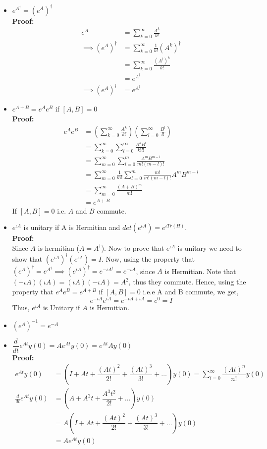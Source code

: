 \documentclass[12pt, oneside]{book}
\theoremstyle{definition}
\theoremstyle{definition}
\theoremstyle{remark}
\begin{document}
\begin{itemize}
    \item $e^{A^{\dagger}}=(e^A)^{\dagger}$\\
    \textbf{Proof: }
    \begin{align*}
        e^A&=\sum_{k=0}^{\infty} \frac{A^k}{k!}\\
        \implies (e^A)^{\dagger}&=\sum_{k=0}^{\infty} \frac{1}{k!}(A^k)^{\dagger}\\
        &=\sum_{k=0}^{\infty} \frac{(A^{\dagger})^k}{k!}\\
        &=e^{A^{\dagger}}\\
        \implies (e^A)^{\dagger}&=e^{A^{\dagger}}
    \end{align*}
    \item $e^{A+B}=e^Ae^B$ if $[A,B]=0$\\
    \textbf{Proof: }
    \begin{align*}
    e^Ae^B&=\left(\sum_{k=0}^{\infty} \frac{A^k}{k!} \right)\left(\sum_{l=0}^{\infty} \frac{B^l}{l!}\right)\\
    &=\sum_{k=0}^{\infty} \sum_{l=0}^{\infty} \frac{A^{k}B^{l}}{k!l!}\\
    &=\sum_{m=0}^{\infty} \sum_{l=0}^{m} \frac{A^mB^{m-l}}{m!(m-l)!}\\
    &=\sum_{m=0}^{\infty} \frac{1}{m!} \sum_{l=0}^m \frac{m!}{m!(m-l)!}A^mB^{m-l}\\
    &=\sum_{m=0}^{\infty} \frac{(A+B)^m}{m!}\\
    &=e^{A+B}
    \end{align*}
    If $[A,B]=0$ i.e. $A$ and $B$ commute.
    \item $e^{\iota A}$ is unitary if A is Hermitian and $det(e^{\iota A})= e^{\iota Tr(H)}$.\\
    \textbf{Proof: }\\
    Since $A$ is hermitian ($A=A^{\dagger}$). Now to prove that $e^{\iota A}$ is unitary we need to show that $(e^{\iota A})^{\dagger}(e^{\iota A})=I$. Now, using the property that $(e^{A})^{\dagger}=e^{A^{\dagger}} \implies (e^{\iota A})^{\dagger}=e^{-\iota A^{\dagger}}=e^{-\iota A}$, since $A$ is Hermitian. Note that $(-\iota A)(\iota A)=(\iota A)(-\iota A)=A^2$, thus they commute. Hence, using the property that $e^A e^B=e^{A+B}$ if $[A,B]=0$ i.e.e A and B commute, we get,
    \[
    e^{-\iota A}e^{\iota A}= e^{-\iota A +\iota A}=e^{0}=I
    \]
    Thus, $e^{\iota A}$ is Unitary if $A$ is Hermitian.
    \item $(e^{A})^{-1}=e^{-A}$
    \item $\dfrac{d}{dt}e^{At}y(0)=Ae^{At}y(0)=e^{At}Ay(0)$\\
    \textbf{Proof: }\\
    \begin{align*}
    e^{At}y(0)&=\left(I+At+\dfrac{(At)^2}{2!}+\dfrac{(At)^3}{3!}+\ldots \right)y(0)= \sum_{i=0}^{\infty} \dfrac{(At)^n}{n!}y(0)\\
    \frac{d}{dt}e^{At}y(0)&=\left(A+A^2t+\dfrac{A^3t^2}{2!}+\ldots\right)y(0)\\
    &=A(I+At+\dfrac{(At)^2}{2!}+\dfrac{(At)^3}{3!}+\ldots)y(0)\\
    &=Ae^{At}y(0)
    \end{align*}
    

\end{itemize}
\end{document}
